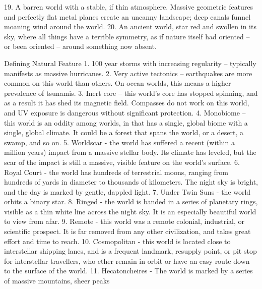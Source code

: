                                                                                                                  


    19. A barren world with a stable, if thin atmosphere. Massive geometric features and perfectly  
        flat metal planes create an uncanny landscape; deep canals funnel moaning wind around  
        the world.   
    20. An ancient world, star red and swollen in its sky, where all things have a terrible symmetry,  
        as if nature itself had oriented -- or been oriented -- around something now absent.   

Defining Natural Feature  
    1.  100 year storms with increasing regularity -- typically manifests as massive hurricanes.   
    2.  Very active tectonics -- earthquakes are more common on this world than others. On  
        ocean worlds, this means a higher prevalence of tsunamis.   
    3.  Inert core -- this world’s core has stopped spinning, and as a result it has shed its  
        magnetic field. Compasses do not work on this world, and UV exposure is dangerous  
        without significant protection.   
    4.  Monobiome -- this world is an oddity among worlds, in that has a single, global biome with  
        a single, global climate. It could be a forest that spans the world, or a desert, a swamp,  
        and so on.    
    5.  Worldscar - the world has suffered a recent (within a million years) impact from a massive  
        stellar body. Its climate has leveled, but the scar of the impact is still a massive, visible  
        feature on the world’s surface.   
    6.  Royal Court - the world has hundreds of terrestrial moons, ranging from hundreds of yards  
        in diameter to thousands of kilometers. The night sky is bright, and the day is marked by  
        gentle, dappled light.   
    7.  Under Twin Suns - the world orbits a binary star.  
    8.  Ringed -  the world is banded in a series of planetary rings, visible as a thin white line  
        across the night sky. It is an especially beautiful world to view from afar.    
    9.  Remote - this world was a remote colonial, industrial, or scientific prospect. It is far  
        removed from any other civilization, and takes great effort and time to reach.  
    10. Cosmopolitan - this world is located close to interstellar shipping lanes, and is a frequent  
        landmark, resupply point, or pit stop for interstellar travellers, who ether remain in orbit or  
        have an easy route down to the surface of the world.   
    11. Hecatoncheires - The world is marked by a series of massive mountains, sheer peaks  
